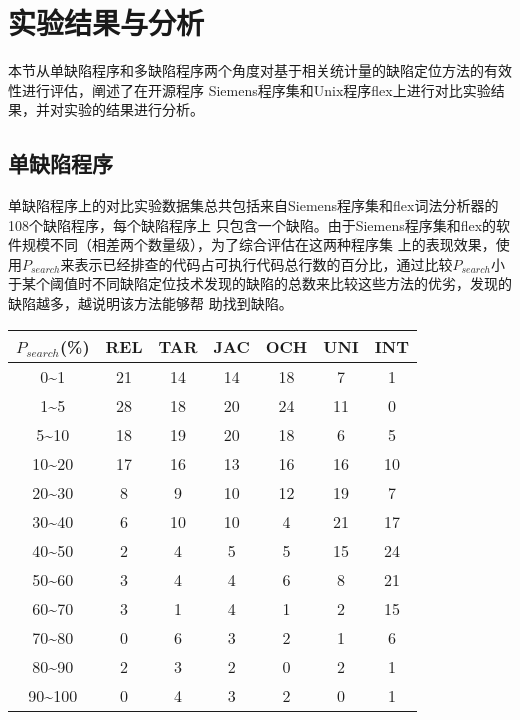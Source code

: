 \section{实验结果与分析}
本节从单缺陷程序和多缺陷程序两个角度对基于相关统计量的缺陷定位方法的有效性进行评估，阐述了在开源程序
Siemens程序集和Unix程序flex上进行对比实验结果，并对实验的结果进行分析。

\subsection{单缺陷程序}
单缺陷程序上的对比实验数据集总共包括来自Siemens程序集和flex词法分析器的108个缺陷程序，每个缺陷程序上
只包含一个缺陷。由于Siemens程序集和flex的软件规模不同（相差两个数量级），为了综合评估在这两种程序集
上的表现效果，使用$P_{search}$来表示已经排查的代码占可执行代码总行数的百分比，通过比较$P_{search}$小
于某个阈值时不同缺陷定位技术发现的缺陷的总数来比较这些方法的优劣，发现的缺陷越多，越说明该方法能够帮
助找到缺陷。

\begin{center}
\label{tbl:single}
\begin{tabular}{ccccccc}
\toprule
$P_{search}$(\%) & REL & TAR & JAC & OCH & UNI & INT\\ \hline
0\textasciitilde1 & 21 & 14 & 14 & 18 & 7 & 1 \\ \hline
1\textasciitilde5 & 28 & 18 & 20 & 24 & 11 & 0 \\ \hline
5\textasciitilde10 & 18 & 19 & 20 & 18 & 6 & 5 \\ \hline
10\textasciitilde20 & 17 & 16 & 13 & 16 & 16 & 10 \\ \hline
20\textasciitilde30 & 8 & 9 & 10 & 12 & 19 & 7 \\ \hline
30\textasciitilde40 & 6 & 10 & 10 & 4 & 21 & 17 \\ \hline
40\textasciitilde50 & 2 & 4 & 5 & 5 & 15 & 24 \\ \hline
50\textasciitilde60 & 3 & 4 & 4 & 6 & 8 & 21 \\ \hline
60\textasciitilde70 & 3 & 1 & 4 & 1 & 2 & 15 \\ \hline
70\textasciitilde80 & 0 & 6 & 3 & 2 & 1 & 6 \\ \hline
80\textasciitilde90 & 2 & 3 & 2 & 0 & 2 & 1 \\ \hline
90\textasciitilde100 & 0 & 4 & 3 & 2 & 0 & 1 \\ 
\bottomrule
\end{tabular}
\end{center}

